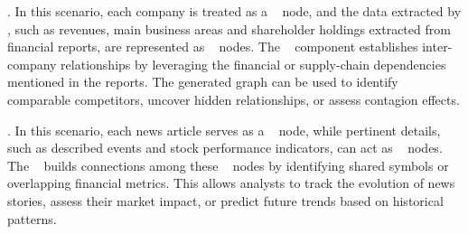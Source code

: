 . In this scenario, each company is treated as a \fact~ node,
and the data extracted by \inspector, such as revenues, main business areas and shareholder holdings extracted from financial reports, are represented as \dimension~ nodes.
The \navigator~ component establishes inter-company relationships by leveraging the financial or supply-chain dependencies mentioned in the reports. The generated graph can be used to identify comparable competitors, uncover hidden relationships, or assess contagion effects.

. In this scenario, each news article serves as a \fact~ node, while pertinent details, such as described events and stock performance indicators, can act as \dimension~ nodes. The \navigator~ builds connections among these \fact~ nodes by identifying shared symbols or overlapping financial metrics. This allows analysts to track the evolution of news stories, assess their market impact, or predict future trends based on historical patterns.

